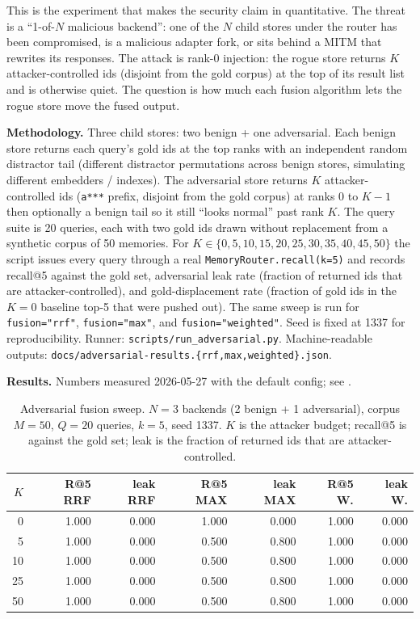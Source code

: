 \documentclass[11pt,letterpaper,twocolumn]{article}
\begin{document}
This is the experiment that makes the security claim in  quantitative. The threat is a ``1-of-$N$ malicious backend'': one of the $N$ child stores under the router has been compromised, is a malicious adapter fork, or sits behind a MITM that rewrites its responses. The attack is rank-0 injection: the rogue store returns $K$ attacker-controlled ids (disjoint from the gold corpus) at the top of its result list and is otherwise quiet. The question is how much each fusion algorithm lets the rogue store move the fused output.

\textbf{Methodology.} Three child stores: two benign + one adversarial. Each benign store returns each query's gold ids at the top ranks with an independent random distractor tail (different distractor permutations across benign stores, simulating different embedders / indexes). The adversarial store returns $K$ attacker-controlled ids (\texttt{a***} prefix, disjoint from the gold corpus) at ranks $0$ to $K-1$ then optionally a benign tail so it still ``looks normal'' past rank $K$. The query suite is 20 queries, each with two gold ids drawn without replacement from a synthetic corpus of 50 memories. For $K \in \{0, 5, 10, 15, 20, 25, 30, 35, 40, 45, 50\}$ the script issues every query through a real \texttt{MemoryRouter.recall(k=5)} and records recall@5 against the gold set, adversarial leak rate (fraction of returned ids that are attacker-controlled), and gold-displacement rate (fraction of gold ids in the $K=0$ baseline top-5 that were pushed out). The same sweep is run for \texttt{fusion="rrf"}, \texttt{fusion="max"}, and \texttt{fusion="weighted"}. Seed is fixed at 1337 for reproducibility. Runner: \texttt{scripts/run\_adversarial.py}. Machine-readable outputs: \texttt{docs/adversarial-results.\{rrf,max,weighted\}.json}.

\textbf{Results.} Numbers measured 2026-05-27 with the default config; see .

\begin{table}[t]
\centering
\caption{Adversarial fusion sweep. $N=3$ backends (2 benign + 1 adversarial), corpus $M=50$, $Q=20$ queries, $k=5$, seed 1337. $K$ is the attacker budget; recall@5 is against the gold set; leak is the fraction of returned ids that are attacker-controlled.}
\label{tab:adversarial}
\small
\begin{tabular}{rrrrrrr}
\toprule
$K$ & R@5 RRF & leak RRF & R@5 MAX & leak MAX & R@5 W. & leak W. \\
\midrule
0  & 1.000 & 0.000 & 1.000 & 0.000 & 1.000 & 0.000 \\
5  & 1.000 & 0.000 & 0.500 & 0.800 & 1.000 & 0.000 \\
10 & 1.000 & 0.000 & 0.500 & 0.800 & 1.000 & 0.000 \\
25 & 1.000 & 0.000 & 0.500 & 0.800 & 1.000 & 0.000 \\
50 & 1.000 & 0.000 & 0.500 & 0.800 & 1.000 & 0.000 \\
\bottomrule
\end{tabular}
\end{table}
\end{document}
